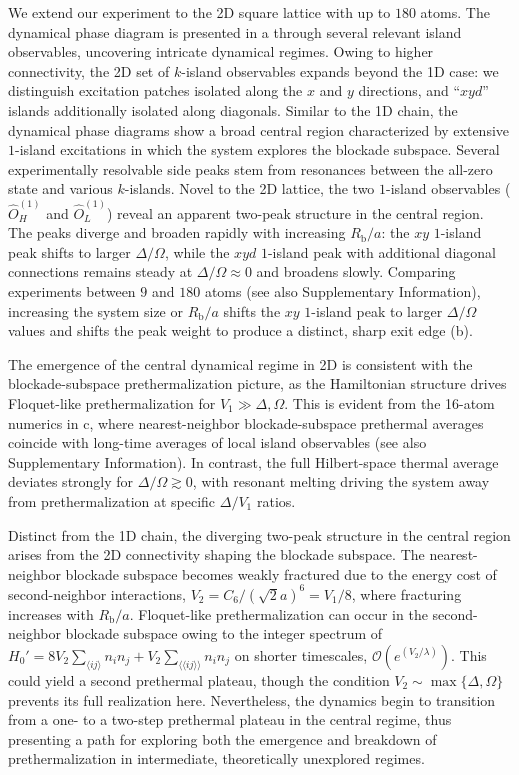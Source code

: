 \documentclass[english,floatfix,twocolumn,showpacs, aps, prx, reprint, superscriptaddress, longbibliography]{revtex4-2}
\begin{document}
We extend our experiment to the 2D square lattice with up to $180$ atoms. The dynamical phase diagram is presented in a through several relevant island observables, uncovering intricate dynamical regimes. Owing to higher connectivity, the 2D set of $k$-island observables expands beyond the 1D case: we distinguish excitation patches isolated along the $x$ and $y$ directions, and ``$xyd$'' islands additionally isolated along diagonals. Similar to the 1D chain, the dynamical phase diagrams show a broad central region characterized by extensive $1$-island excitations in which the system explores the blockade subspace. Several experimentally resolvable side peaks stem from resonances between the all-zero state and various $k$-islands. Novel to the 2D lattice, the two $1$-island observables ($\hat{O}_H^{(1)}$ and $\hat{O}_L^{(1)}$) reveal an apparent two-peak structure in the central region. The peaks diverge and broaden rapidly with increasing $R_\mathrm{b} / a$: the $xy$ $1$-island peak shifts to larger $\Delta / \Omega$, while the $xyd$ $1$-island peak with additional diagonal connections remains steady at $\Delta / \Omega \approx 0$ and broadens slowly. Comparing experiments between $9$ and $180$ atoms (see also Supplementary Information), increasing the system size or $R_\mathrm{b}/a$ shifts the $xy$ $1$-island peak to larger $\Delta / \Omega$ values and shifts the peak weight to produce a distinct, sharp exit edge (b).

The emergence of the central dynamical regime in 2D is consistent with the blockade-subspace prethermalization picture, as the Hamiltonian structure drives Floquet-like prethermalization for $V_1 \gg \Delta, \Omega$. This is evident from the 16-atom numerics in c, where nearest-neighbor blockade-subspace prethermal averages coincide with long-time averages of local island observables (see also Supplementary Information). In contrast, the full Hilbert-space thermal average deviates strongly for $\Delta / \Omega \gtrsim 0$, with resonant melting driving the system away from prethermalization at specific $\Delta / V_1$ ratios.

Distinct from the 1D chain, the diverging two-peak structure in the central region arises from the 2D connectivity shaping the blockade subspace. The nearest-neighbor blockade subspace becomes weakly fractured due to the energy cost of second-neighbor interactions, $V_2 = C_6 / (\sqrt{2} a)^6 = V_1 / 8$, where fracturing increases with $R_\mathrm{b} / a$. Floquet-like prethermalization can occur in the second-neighbor blockade subspace owing to the integer spectrum of  $H_0' = 8 V_2 \sum_{\langle ij \rangle} n_i n_j + V_2 \sum_{\langle\langle ij \rangle \rangle} n_i n_j$ on shorter timescales, $\mathcal{O}(e^{(V_2/\lambda)})$. This could yield a second prethermal plateau, though the condition $V_2 \sim \max\{\Delta, \Omega\}$ prevents its full realization here. Nevertheless, the dynamics begin to transition from a one- to a two-step prethermal plateau in the central regime, thus presenting a path for exploring both the emergence and breakdown of prethermalization in intermediate, theoretically unexplored regimes.
\end{document}
